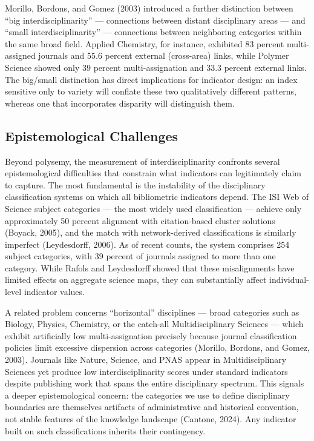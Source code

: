 \documentclass[
]{article}
\begin{document}
Morillo, Bordons, and Gomez (2003) introduced a further distinction
between ``big interdisciplinarity'' --- connections between distant
disciplinary areas --- and ``small interdisciplinarity'' --- connections
between neighboring categories within the same broad field. Applied
Chemistry, for instance, exhibited 83 percent multi-assigned journals
and 55.6 percent external (cross-area) links, while Polymer Science
showed only 39 percent multi-assignation and 33.3 percent external
links. The big/small distinction has direct implications for indicator
design: an index sensitive only to variety will conflate these two
qualitatively different patterns, whereas one that incorporates
disparity will distinguish them.

\hypertarget{epistemological-challenges}{%
\subsection{Epistemological
Challenges}\label{epistemological-challenges}}

Beyond polysemy, the measurement of interdisciplinarity confronts
several epistemological difficulties that constrain what indicators can
legitimately claim to capture. The most fundamental is the instability
of the disciplinary classification systems on which all bibliometric
indicators depend. The ISI Web of Science subject categories --- the
most widely used classification --- achieve only approximately 50
percent alignment with citation-based cluster solutions (Boyack, 2005),
and the match with network-derived classifications is similarly
imperfect (Leydesdorff, 2006). As of recent counts, the system comprises
254 subject categories, with 39 percent of journals assigned to more
than one category. While Rafols and Leydesdorff showed that these
misalignments have limited effects on aggregate science maps, they can
substantially affect individual-level indicator values.

A related problem concerns ``horizontal'' disciplines --- broad
categories such as Biology, Physics, Chemistry, or the catch-all
Multidisciplinary Sciences --- which exhibit artificially low
multi-assignation precisely because journal classification policies
limit excessive dispersion across categories (Morillo, Bordons, and
Gomez, 2003). Journals like Nature, Science, and PNAS appear in
Multidisciplinary Sciences yet produce low interdisciplinarity scores
under standard indicators despite publishing work that spans the entire
disciplinary spectrum. This signals a deeper epistemological concern:
the categories we use to define disciplinary boundaries are themselves
artifacts of administrative and historical convention, not stable
features of the knowledge landscape (Cantone, 2024). Any indicator built
on such classifications inherits their contingency.
\end{document}
